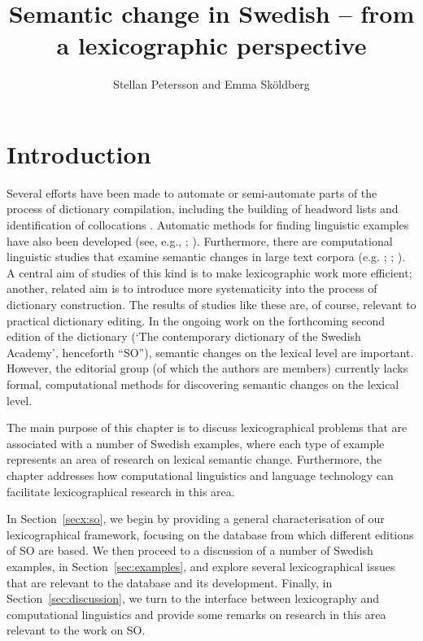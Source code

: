\documentclass[output=paper]{langscibook}
\author{Stellan Petersson\affiliation{University of Gothenburg} and
Emma Sköldberg\affiliation{University of Gothenburg}}
\title{Semantic change in Swedish -- from a lexicographic perspective}
\begin{document}
\maketitle

\section{Introduction}
Several efforts have been made to automate or semi-automate parts of the process of dictionary compilation, including the building of headword lists and identification of collocations \citep{cook2014}. Automatic methods for finding linguistic examples have also been developed (see, e.g., \citealt{kilgarriff2008}; \citealt{pilan2016}). Furthermore, there are computational linguistic studies that examine semantic changes in large text corpora (e.g. \citealt{cavallin2012}; \citealt{cook13alexicographic}; \citealt{nimb2020}). A central aim of studies of this kind is to make lexicographic work more efficient; another, related aim is to introduce more systematicity into the process of dictionary construction. The results of studies like these are, of course, relevant to practical dictionary editing. In the ongoing work on the forthcoming second edition of the dictionary  (`The contemporary dictionary of the Swedish Academy', henceforth ``SO''),
semantic changes on the lexical level are important. However, the editorial group (of which the authors are members) currently lacks formal, computational methods for discovering semantic changes on the lexical level.

The main purpose of this chapter is to discuss lexicographical problems that are associated with a number of Swedish examples, where each type of example represents an area of research on lexical semantic change. Furthermore, the chapter addresses how computational linguistics and language technology can facilitate lexicographical research in this area. 

In Section~\ref{secx:so}, we begin by providing a general characterisation of our lexicographical framework, focusing on the database from which different editions of SO are based. We then proceed to a discussion of a number of Swedish examples, in Section~\ref{sec:examples}, and explore several lexicographical issues that are relevant to the database and its development. Finally, in Section~\ref{sec:discussion}, we turn to the interface between lexicography and computational linguistics and provide some remarks on research in this area relevant to the work on SO.    
 
\end{document}
